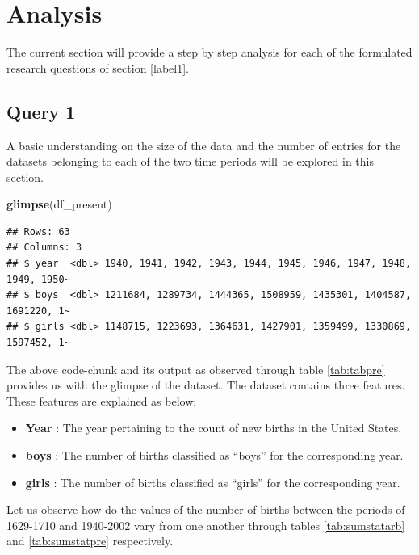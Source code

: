 \documentclass[11pt,a4paper,]{article}
\newenvironment{Shaded}{\begin{snugshade}}{\end{snugshade}}
\newcommand{\FunctionTok}[1]{\textcolor[rgb]{0.13,0.29,0.53}{\textbf{#1}}}
\newcommand{\NormalTok}[1]{#1}
\providecommand{\tightlist}{%
  \setlength{\itemsep}{0pt}\setlength{\parskip}{0pt}}
\begin{document}
\hypertarget{label2}{%
\section{Analysis}\label{label2}}

The current section will provide a step by step analysis for each of the formulated research questions of section \ref{label1}.

\hypertarget{query-1}{%
\subsection{Query 1}\label{query-1}}

A basic understanding on the size of the data and the number of entries for the datasets belonging to each of the two time periods will be explored in this section.

\begin{Shaded}
\begin{Highlighting}[]
\FunctionTok{glimpse}\NormalTok{(df\_present)  }
\end{Highlighting}
\end{Shaded}

\begin{verbatim}
## Rows: 63
## Columns: 3
## $ year  <dbl> 1940, 1941, 1942, 1943, 1944, 1945, 1946, 1947, 1948, 1949, 1950~
## $ boys  <dbl> 1211684, 1289734, 1444365, 1508959, 1435301, 1404587, 1691220, 1~
## $ girls <dbl> 1148715, 1223693, 1364631, 1427901, 1359499, 1330869, 1597452, 1~
\end{verbatim}

\normalsize

The above code-chunk and its output as observed through table \ref{tab:tabpre} provides us with the glimpse of the dataset. The dataset contains three features. These features are explained as below:

\begin{itemize}
\tightlist
\item
  \textbf{Year} : The year pertaining to the count of new births in the United States.
\item
  \textbf{boys} : The number of births classified as ``boys'' for the corresponding year.
\item
  \textbf{girls} : The number of births classified as ``girls'' for the corresponding year.
\end{itemize}

Let us observe how do the values of the number of births between the periods of 1629-1710 and 1940-2002 vary from one another through tables \ref{tab:sumstatarb} and \ref{tab:sumstatpre} respectively.
\end{document}
